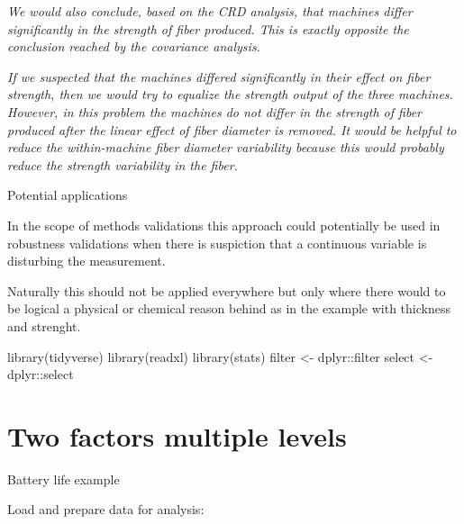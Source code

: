 \documentclass[
]{book}
\newenvironment{Shaded}{\begin{snugshade}}{\end{snugshade}}
\newcommand{\FunctionTok}[1]{\textcolor[rgb]{0.00,0.00,0.00}{#1}}
\newcommand{\NormalTok}[1]{#1}
\newcommand{\OtherTok}[1]{\textcolor[rgb]{0.56,0.35,0.01}{#1}}
\newcommand{\SpecialCharTok}[1]{\textcolor[rgb]{0.00,0.00,0.00}{#1}}
\begin{document}
\emph{We would also conclude, based on the CRD analysis, that machines differ significantly in the strength of fiber produced. This is exactly opposite the conclusion reached by the covariance analysis.}

\emph{If we suspected that the machines differed significantly in their effect on fiber strength, then we would try to equalize the strength output of the three machines. However, in this problem the machines do not differ in the strength of fiber produced after the linear effect of fiber diameter is removed. It would be helpful to reduce the within-machine fiber diameter variability because this would probably reduce the strength variability in the fiber.}

Potential applications

In the scope of methods validations this approach could potentially be used in robustness validations when there is suspiction that a continuous variable is disturbing the measurement.

Naturally this should not be applied everywhere but only where there would to be logical a physical or chemical reason behind as in the example with thickness and strenght.

\begin{Shaded}
\begin{Highlighting}[]
\FunctionTok{library}\NormalTok{(tidyverse)}
\FunctionTok{library}\NormalTok{(readxl)}
\FunctionTok{library}\NormalTok{(stats)}
\NormalTok{filter }\OtherTok{\textless{}{-}}\NormalTok{ dplyr}\SpecialCharTok{::}\NormalTok{filter}
\NormalTok{select }\OtherTok{\textless{}{-}}\NormalTok{ dplyr}\SpecialCharTok{::}\NormalTok{select}
\end{Highlighting}
\end{Shaded}

\hypertarget{two-factors-multiple-levels}{%
\section{Two factors multiple levels}\label{two-factors-multiple-levels}}

Battery life example

Load and prepare data for analysis:
\end{document}
